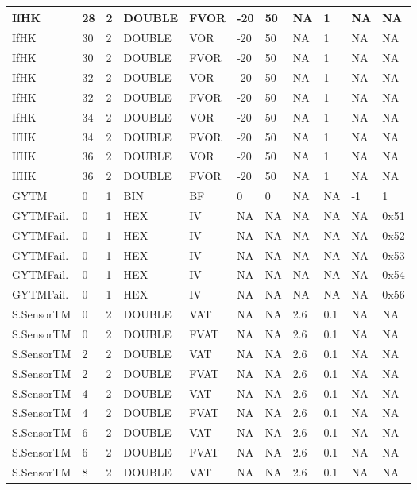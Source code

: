 {\begin{longtable}{|l|l|l|l|l|l|l|l|l|l|l|}
IfHK & 28 & 2 & DOUBLE & FVOR & -20 & 50 & NA & 1 & NA & NA \\ \hline
IfHK & 30 & 2 & DOUBLE & VOR & -20 & 50 & NA & 1 & NA & NA \\ \hline
IfHK & 30 & 2 & DOUBLE & FVOR & -20 & 50 & NA & 1 & NA & NA \\ \hline
IfHK & 32 & 2 & DOUBLE & VOR & -20 & 50 & NA & 1 & NA & NA \\ \hline
IfHK & 32 & 2 & DOUBLE & FVOR & -20 & 50 & NA & 1 & NA & NA \\ \hline
IfHK & 34 & 2 & DOUBLE & VOR & -20 & 50 & NA & 1 & NA & NA \\ \hline
IfHK & 34 & 2 & DOUBLE & FVOR & -20 & 50 & NA & 1 & NA & NA \\ \hline
IfHK & 36 & 2 & DOUBLE & VOR & -20 & 50 & NA & 1 & NA & NA \\ \hline
IfHK & 36 & 2 & DOUBLE & FVOR & -20 & 50 & NA & 1 & NA & NA \\ \hline
GYTM & 0 & 1 & BIN & BF & 0 & 0 & NA & NA & -1 & 1 \\ \hline
GYTMFail. & 0 & 1 & HEX & IV & NA & NA & NA & NA & NA & 0x51 \\ \hline
GYTMFail. & 0 & 1 & HEX & IV & NA & NA & NA & NA & NA & 0x52 \\ \hline
GYTMFail. & 0 & 1 & HEX & IV & NA & NA & NA & NA & NA & 0x53 \\ \hline
GYTMFail. & 0 & 1 & HEX & IV & NA & NA & NA & NA & NA & 0x54 \\ \hline
GYTMFail. & 0 & 1 & HEX & IV & NA & NA & NA & NA & NA & 0x56 \\ \hline
S.SensorTM & 0 & 2 & DOUBLE & VAT & NA & NA & 2.6 & 0.1 & NA & NA \\ \hline
S.SensorTM & 0 & 2 & DOUBLE & FVAT & NA & NA & 2.6 & 0.1 & NA & NA \\ \hline
S.SensorTM & 2 & 2 & DOUBLE & VAT & NA & NA & 2.6 & 0.1 & NA & NA \\ \hline
S.SensorTM & 2 & 2 & DOUBLE & FVAT & NA & NA & 2.6 & 0.1 & NA & NA \\ \hline
S.SensorTM & 4 & 2 & DOUBLE & VAT & NA & NA & 2.6 & 0.1 & NA & NA \\ \hline
S.SensorTM & 4 & 2 & DOUBLE & FVAT & NA & NA & 2.6 & 0.1 & NA & NA \\ \hline
S.SensorTM & 6 & 2 & DOUBLE & VAT & NA & NA & 2.6 & 0.1 & NA & NA \\ \hline
S.SensorTM & 6 & 2 & DOUBLE & FVAT & NA & NA & 2.6 & 0.1 & NA & NA \\ \hline
S.SensorTM & 8 & 2 & DOUBLE & VAT & NA & NA & 2.6 & 0.1 & NA & NA \\ \hline

\end{longtable}}
